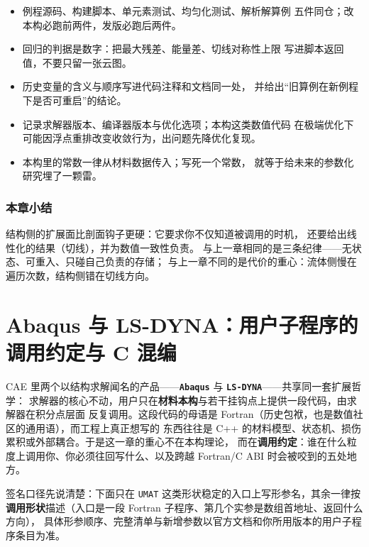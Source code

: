 \documentclass[12pt,a4paper,fontset=fandol]{ctexbook}
\newcommand{\Tp}[1]{\texttt{#1}}
\newcommand{\Bk}{\discretionary{}{}{}}
\newcommand{\Lib}[1]{\textbf{\texttt{#1}}}
\newcommand{\Lang}[1]{\textsf{#1}}
\newcommand{\CL}{\Lang{C}}
\newcommand{\CPP}{\Lang{C++}}
\newcommand{\DomCAE}{\Lang{CAE}}
\begin{document}
\begin{bestpractice}[title={用户材料扩展的交付清单}]
\begin{itemize}
  \item 例程源码、构建脚本、单元素测试、均匀化测试、解析解算例
        五件同仓；改本构必跑前两件，发版必跑后两件。
  \item 回归的判据是数字：把最大残差、能量差、切线对称性上限
        写进脚本返回值，不要只留一张云图。
  \item 历史变量的含义与顺序写进代码注释和文档同一处，
        并给出``旧算例在新例程下是否可重启''的结论。
  \item 记录求解器版本、编译器版本与优化选项；本构这类数值代码
        在极端优化下可能因浮点重排改变收敛行为，出问题先降优化复现。
  \item 本构里的常数一律从材料数据传入；写死一个常数，
        就等于给未来的参数化研究埋了一颗雷。
\end{itemize}
\end{bestpractice}

\subsection*{本章小结}
结构侧的扩展面比剖面钩子更硬：它要求你不仅知道被调用的时机，
还要给出线性化的结果（切线），并为数值一致性负责。
与上一章相同的是三条纪律——无状态、可重入、只碰自己负责的存储；
与上一章不同的是代价的重心：流体侧慢在遍历次数，结构侧错在切线方向。

\chapter{Abaqus 与 LS-DYNA：用户子程序的调用约定与 C 混编}
\label{ch:ch05-abaqus-usub}

\DomCAE{} 里两个以结构求解闻名的产品——\Lib{Abaqus} 与 \Lib{LS-DYNA}——共享同一套扩展哲学：
求解器的核心不动，用户只在\textbf{材料本构}与若干挂钩点上提供一段代码，由求解器在积分点层面
反复调用。这段代码的母语是 Fortran（历史包袱，也是数值社区的通用语），而工程上真正想写的
东西往往是 \CPP{} 的材料模型、状态机、损伤累积或外部耦合。于是这一章的重心不在本构理论，
而在\textbf{调用约定}：谁在什么粒度上调用你、你必须往回写什么、以及跨越
Fortran/{\Bk}\CL{} ABI 时会被咬到的五处地方。

签名口径先说清楚：下面只在 \Tp{UMAT} 这类形状稳定的入口上写形参名，其余一律按
\textbf{调用形状}描述（入口是一段 Fortran 子程序、第几个实参是数组首地址、返回什么方向），
具体形参顺序、完整清单与新增参数以官方文档和你所用版本的用户子程序条目为准。
\end{document}
